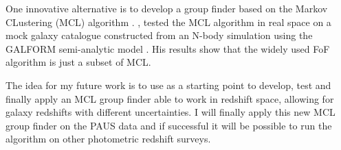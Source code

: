 \documentclass[11pt]{article}
\begin{document}
One innovative alternative is to develop a group finder based on the Markov CLustering (MCL) algorithm \citep{dongen00}. \cite{stothert18_thesis}, tested the MCL algorithm in real space on a mock galaxy catalogue constructed from an N-body simulation using the GALFORM semi-analytic model \citep{gonzalez14}. His results show that the widely used FoF algorithm is just a subset of MCL. 

The idea for my future work is to use \cite{stothert18_thesis} as a starting point to develop, test and finally apply an MCL group finder able to work in redshift space, allowing for galaxy redshifts with different uncertainties. I will finally apply this new MCL group finder on the PAUS data and if successful it will be possible to run the algorithm on other photometric redshift surveys.


\end{document}
